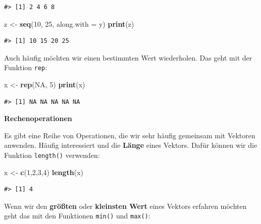 \documentclass[]{book}
\newenvironment{Shaded}{\begin{snugshade}}{\end{snugshade}}
\newcommand{\KeywordTok}[1]{\textcolor[rgb]{0.13,0.29,0.53}{\textbf{#1}}}
\newcommand{\DataTypeTok}[1]{\textcolor[rgb]{0.13,0.29,0.53}{#1}}
\newcommand{\DecValTok}[1]{\textcolor[rgb]{0.00,0.00,0.81}{#1}}
\newcommand{\StringTok}[1]{\textcolor[rgb]{0.31,0.60,0.02}{#1}}
\newcommand{\OtherTok}[1]{\textcolor[rgb]{0.56,0.35,0.01}{#1}}
\newcommand{\NormalTok}[1]{#1}
\begin{document}
\begin{verbatim}
#> [1] 2 4 6 8
\end{verbatim}

\begin{Shaded}
\begin{Highlighting}[]
\NormalTok{z <-}\StringTok{ }\KeywordTok{seq}\NormalTok{(}\DecValTok{10}\NormalTok{, }\DecValTok{25}\NormalTok{, }\DataTypeTok{along.with =}\NormalTok{ y)}
\KeywordTok{print}\NormalTok{(z)}
\end{Highlighting}
\end{Shaded}

\begin{verbatim}
#> [1] 10 15 20 25
\end{verbatim}

Auch häufig möchten wir einen bestimmten Wert wiederholen. Das geht mit
der Funktion \texttt{rep}:

\begin{Shaded}
\begin{Highlighting}[]
\NormalTok{x <-}\StringTok{ }\KeywordTok{rep}\NormalTok{(}\OtherTok{NA}\NormalTok{, }\DecValTok{5}\NormalTok{)}
\KeywordTok{print}\NormalTok{(x)}
\end{Highlighting}
\end{Shaded}

\begin{verbatim}
#> [1] NA NA NA NA NA
\end{verbatim}

\textbf{Rechenoperationen}

Es gibt eine Reihe von Operationen, die wir sehr häufig gemeinsam mit
Vektoren anwenden. Häufig interessiert und die \textbf{Länge} eines
Vektors. Dafür können wir die Funktion \texttt{length()} verwenden:

\begin{Shaded}
\begin{Highlighting}[]
\NormalTok{x <-}\StringTok{ }\KeywordTok{c}\NormalTok{(}\DecValTok{1}\NormalTok{,}\DecValTok{2}\NormalTok{,}\DecValTok{3}\NormalTok{,}\DecValTok{4}\NormalTok{)}
\KeywordTok{length}\NormalTok{(x)}
\end{Highlighting}
\end{Shaded}

\begin{verbatim}
#> [1] 4
\end{verbatim}

Wenn wir den \textbf{größten} oder \textbf{kleinsten Wert} eines Vektors
erfahren möchten geht das mit den Funktionen \texttt{min()} und
\texttt{max()}:
\end{document}
